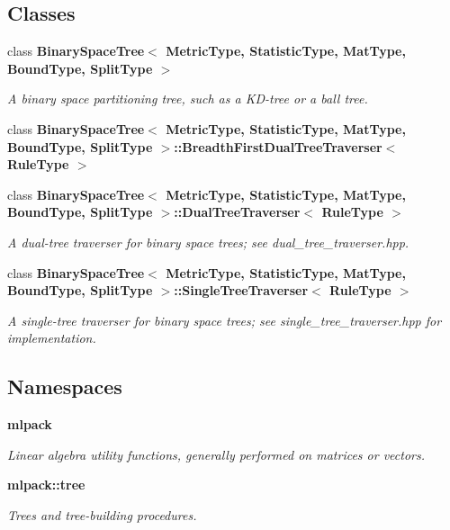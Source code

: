 \subsection*{Classes}
\begin{DoxyCompactItemize}
\item 
class \textbf{ Binary\+Space\+Tree$<$ Metric\+Type, Statistic\+Type, Mat\+Type, Bound\+Type, Split\+Type $>$}
\begin{DoxyCompactList}\small\item\em A binary space partitioning tree, such as a K\+D-\/tree or a ball tree. \end{DoxyCompactList}\item 
class \textbf{ Binary\+Space\+Tree$<$ Metric\+Type, Statistic\+Type, Mat\+Type, Bound\+Type, Split\+Type $>$\+::\+Breadth\+First\+Dual\+Tree\+Traverser$<$ Rule\+Type $>$}
\item 
class \textbf{ Binary\+Space\+Tree$<$ Metric\+Type, Statistic\+Type, Mat\+Type, Bound\+Type, Split\+Type $>$\+::\+Dual\+Tree\+Traverser$<$ Rule\+Type $>$}
\begin{DoxyCompactList}\small\item\em A dual-\/tree traverser for binary space trees; see dual\+\_\+tree\+\_\+traverser.\+hpp. \end{DoxyCompactList}\item 
class \textbf{ Binary\+Space\+Tree$<$ Metric\+Type, Statistic\+Type, Mat\+Type, Bound\+Type, Split\+Type $>$\+::\+Single\+Tree\+Traverser$<$ Rule\+Type $>$}
\begin{DoxyCompactList}\small\item\em A single-\/tree traverser for binary space trees; see single\+\_\+tree\+\_\+traverser.\+hpp for implementation. \end{DoxyCompactList}\end{DoxyCompactItemize}
\subsection*{Namespaces}
\begin{DoxyCompactItemize}
\item 
 \textbf{ mlpack}
\begin{DoxyCompactList}\small\item\em Linear algebra utility functions, generally performed on matrices or vectors. \end{DoxyCompactList}\item 
 \textbf{ mlpack\+::tree}
\begin{DoxyCompactList}\small\item\em Trees and tree-\/building procedures. \end{DoxyCompactList}\end{DoxyCompactItemize}


